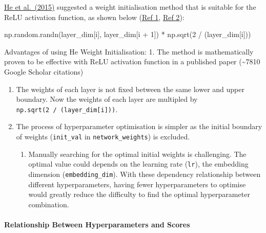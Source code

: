 \documentclass[11pt]{article}
\providecommand{\tightlist}{%
      \setlength{\itemsep}{0pt}\setlength{\parskip}{0pt}}
\newenvironment{Shaded}{}{}
\newcommand{\DecValTok}[1]{\textcolor[rgb]{0.25,0.63,0.44}{{#1}}}
\newcommand{\NormalTok}[1]{{#1}}
\newcommand{\OperatorTok}[1]{\textcolor[rgb]{0.40,0.40,0.40}{{#1}}}
\begin{document}
\href{https://arxiv.org/abs/1502.01852}{He et al.~(2015)} suggested a
weight initialisation method that is suitable for the ReLU activation
function, as shown below
(\href{https://medium.com/usf-msds/deep-learning-best-practices-1-weight-initialization-14e5c0295b94}{Ref
1},
\href{https://towardsdatascience.com/weight-initialization-techniques-in-neural-networks-26c649eb3b78}{Ref
2}):

\begin{Shaded}
\begin{Highlighting}[]
\NormalTok{np.random.randn(layer\_dim[i], layer\_dim[i }\OperatorTok{+} \DecValTok{1}\NormalTok{]) }\OperatorTok{*}\NormalTok{ np.sqrt(}\DecValTok{2} \OperatorTok{/}\NormalTok{ (layer\_dim[i]))}
\end{Highlighting}
\end{Shaded}

Advantages of using He Weight Initialisation: 1. The method is
mathematically proven to be effective with ReLU activation function in a
published paper (\textasciitilde7810 Google Scholar citations)

\begin{enumerate}
\def\labelenumi{\arabic{enumi}.}
\setcounter{enumi}{1}
\item
  The weights of each layer is not fixed between the same lower and
  upper boundary. Now the weights of each layer are multipled by
  \texttt{np.sqrt(2\ /\ (layer\_dim{[}i{]}))}.
\item
  The process of hyperparameter optimisation is simpler as the initial
  boundary of weights (\texttt{init\_val} in \texttt{network\_weights})
  is excluded.

  \begin{enumerate}
  \def\labelenumii{\arabic{enumii}.}
  \tightlist
  \item
    Manually searching for the optimal initial weights is challenging.
    The optimal value could depends on the learning rate (\texttt{lr}),
    the embedding dimension (\texttt{embedding\_dim}). With these
    dependency relationship between different hyperparameters, having
    fewer hyperparameters to optimise would greatly reduce the
    difficulty to find the optimal hyperparameter combination.
  \end{enumerate}
\end{enumerate}

\hypertarget{relationship-between-hyperparameters-and-scores}{%
\paragraph{Relationship Between Hyperparameters and
Scores}\label{relationship-between-hyperparameters-and-scores}}
\end{document}
